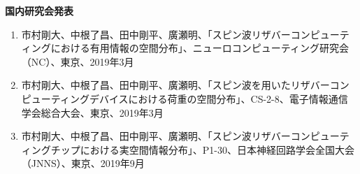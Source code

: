 \documentclass[a4j, twocolumn]{jsarticle}
\begin{document}
{\bf 国内研究会発表}
\begin{enumerate}
\item 市村剛大、中根了昌、田中剛平、廣瀬明、「スピン波リザバーコンピューティングにおける有用情報の空間分布」、ニューロコンピューティング研究会（NC）、東京、2019年3月
\item 市村剛大、中根了昌、田中剛平、廣瀬明、「スピン波を用いたリザバーコンピューティングデバイスにおける荷重の空間分布」、CS-2-8、電子情報通信学会総合大会、東京、2019年3月
\item 市村剛大、中根了昌、田中剛平、廣瀬明、「スピン波リザバーコンピューティングチップにおける実空間情報分布」、P1-30、日本神経回路学会全国大会（JNNS）、東京、2019年9月
\end{enumerate}
\end{document}
